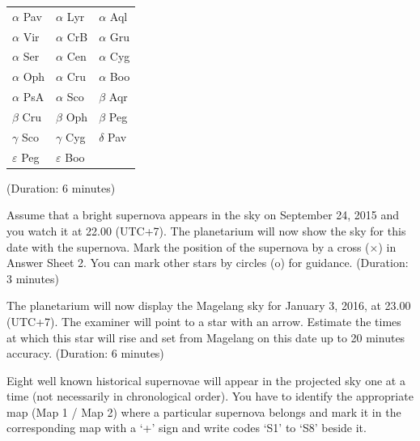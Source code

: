 \begin{center}
\begin{tabular}{lll}
$\alpha$ Pav & $\alpha$ Lyr & $\alpha$ Aql \\
$\alpha$ Vir & $\alpha$ CrB & $\alpha$ Gru \\
$\alpha$ Ser & $\alpha$ Cen & $\alpha$ Cyg \\
$\alpha$ Oph & $\alpha$ Cru & $\alpha$ Boo \\
$\alpha$ PsA & $\alpha$ Sco & $\beta$ Aqr \\
$\beta$ Cru & $\beta$ Oph & $\beta$ Peg \\
$\gamma$ Sco & $\gamma$ Cyg & $\delta$ Pav \\
$\varepsilon$ Peg & $\varepsilon$ Boo & \\
\end{tabular}
\end{center}

(Duration: 6 minutes)


Assume that a bright supernova appears in the sky on September 24, 2015 and
you watch it at 22.00 (UTC+7). The planetarium will now show the sky for
this date with the supernova. Mark the position of the supernova by a cross
($\times$) in Answer Sheet 2. You can mark other stars by circles (o) for
guidance. (Duration: 3 minutes)


The planetarium will now display the Magelang sky for January 3, 2016, at
23.00 (UTC+7). The examiner will point to a star with an arrow. Estimate the
times at which this star will rise and set from Magelang on this date up to
20 minutes accuracy. (Duration: 6 minutes)

Eight well known historical supernovae will appear in the projected sky one
at a time (not necessarily in chronological order). You have to identify the
appropriate map (Map 1 / Map 2) where a particular supernova belongs and
mark it in the corresponding map with a `+' sign and write codes `S1' to
`S8' beside it.

